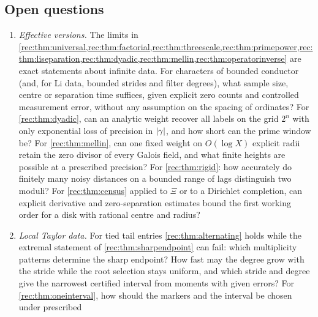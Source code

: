\subsection{Open questions}\label{rec:sec:open}

\begin{enumerate}
\item \emph{Effective versions.} The limits in \cref{rec:thm:universal,rec:thm:factorial,rec:thm:threescale,rec:thm:primepower,rec:thm:liseparation,rec:thm:dyadic,rec:thm:mellin,rec:thm:operatorinverse}
are exact statements about infinite data. For characters of bounded conductor (and, for Li data,
bounded strides and filter degrees), what sample size, centre or separation time suffices, given
explicit zero counts and controlled measurement error, without any assumption on the spacing of
ordinates? For \cref{rec:thm:dyadic}, can an analytic weight recover all labels on the grid $2^n$ with only
exponential loss of precision in $\lvert\gamma\rvert$, and how short can the prime window be? For
\cref{rec:thm:mellin}, can one fixed weight on $O(\log X)$ explicit radii retain the zero divisor of every
Galois field, and what finite heights are possible at a prescribed precision? For \cref{rec:thm:rigid}:
how accurately do finitely many noisy distances on a bounded range of lags distinguish two moduli?
For \cref{rec:thm:census} applied to $\Xi$ or to a Dirichlet completion, can explicit derivative and
zero-separation estimates bound the first working order for a disk with rational centre and radius?
\item \emph{Local Taylor data.} For tied tail entries \cref{rec:thm:alternating} holds while the
extremal statement of \cref{rec:thm:sharpendpoint} can fail: which multiplicity patterns determine the
sharp endpoint? How fast may the degree grow with the stride while the root selection stays uniform,
and which stride and degree give the narrowest certified interval from moments with given errors?
For \cref{rec:thm:oneinterval}, how should the markers and the interval be chosen under prescribed

\end{enumerate}
